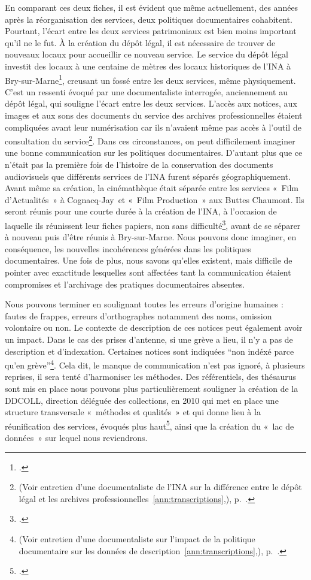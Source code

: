 En comparant ces deux fiches, il est évident que même actuellement, des années après la réorganisation des services, deux politiques documentaires cohabitent. Pourtant, l’écart entre les deux services patrimoniaux est bien moins important qu’il ne le fut. À la création du dépôt légal, il est nécessaire de trouver de nouveaux locaux pour accueillir ce nouveau service. Le service du dépôt légal investit des locaux à une centaine de mètres des locaux historiques de l’INA à Bry-sur-Marne\footcite[][24]{varra2023}, creusant un fossé entre les deux services, même physiquement. C’est un ressenti évoqué par une documentaliste interrogée, anciennement au dépôt légal, qui souligne l’écart entre les deux services. L’accès aux notices, aux images et aux sons des documents du service des archives professionnelles étaient compliquées avant leur numérisation car ils n’avaient même pas accès à l'outil de consultation du service\footnote{(Voir entretien d'une documentaliste de l'INA sur la différence entre le dépôt légal et les archives professionnelles~\ref{ann:transcriptions},), p.~\pageref{ann:transcriptions}.}. Dans ces circonstances, on peut difficilement imaginer une bonne communication sur les politiques documentaires. D'autant plus que ce n'était pas la première fois de l'histoire de la conservation des documents audiovisuels que différents services de l’INA furent séparés géographiquement. Avant même sa création, la cinémathèque était séparée entre les services « Film d’Actualités » à Cognacq-Jay et « Film Production » aux Buttes Chaumont. Ils seront réunis pour une courte durée à la création de l’INA, à l'occasion de laquelle ils réunissent leur fiches papiers, non sans difficulté\footcite[]{saintville1994}, avant de se séparer à nouveau puis d’être réunis à Bry-sur-Marne. Nous pouvons donc imaginer, en conséquence, les nouvelles incohérences générées dans les politiques documentaires. Une fois de plus, nous savons qu'elles existent, mais difficile de pointer avec exactitude lesquelles sont affectées tant la communication étaient compromises et l'archivage des pratiques documentaires absentes. 

Nous pouvons terminer en soulignant toutes les erreurs d'origine humaines : fautes de frappes, erreurs d'orthographes notamment des noms, omission volontaire ou non. Le contexte de description de ces notices peut également avoir un impact. Dans le cas des prises d'antenne, si une grève a lieu, il n'y a pas de description et d'indexation. Certaines notices sont indiquées \enquote{non indéxé parce qu'en grève}\footnote{(Voir entretien d'une documentaliste sur l'impact de la politique documentaire sur les données de description~\ref{ann:transcriptions},), p.~\pageref{ann:transcriptions}.}. Cela dit, le manque de communication n’est pas ignoré, à plusieurs reprises, il sera tenté d'harmoniser les méthodes. Des référentiels, des thésaurus sont mis en place nous pouvons plus particulièrement souligner la création de la DDCOLL, direction déléguée des collections, en 2010 qui met en place une structure transversale « méthodes et qualités » et qui donne lieu à la réunification des services, évoqués plus haut\footcite[][29]{varra2023}, ainsi que la création du « lac de données » sur lequel nous reviendrons. 

